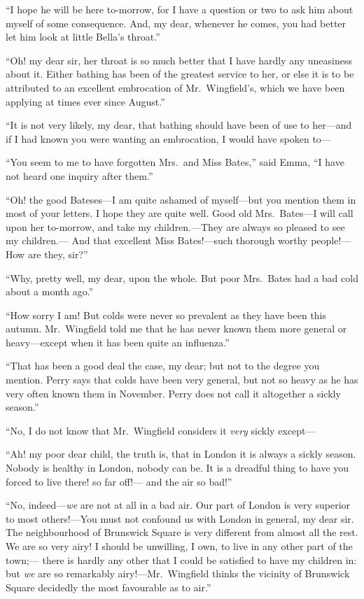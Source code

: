 ``I hope he will be here to-morrow, for I have a question or two to ask
him about myself of some consequence.  And, my dear, whenever he comes,
you had better let him look at little Bella's throat.''

``Oh! my dear sir, her throat is so much better that I have hardly
any uneasiness about it.  Either bathing has been of the greatest
service to her, or else it is to be attributed to an excellent
embrocation of Mr.\ Wingfield's, which we have been applying
at times ever since August.''

``It is not very likely, my dear, that bathing should have been
of use to her---and if I had known you were wanting an embrocation,
I would have spoken to---%

``You seem to me to have forgotten Mrs.\ and Miss Bates,'' said Emma,
``I have not heard one inquiry after them.''

``Oh! the good Bateses---I am quite ashamed of myself---but you
mention them in most of your letters.  I hope they are quite well.
Good old Mrs.\ Bates---I will call upon her to-morrow, and take
my children.---They are always so pleased to see my children.---%
And that excellent Miss Bates!---such thorough worthy people!---%
How are they, sir?''

``Why, pretty well, my dear, upon the whole.  But poor Mrs.\ Bates
had a bad cold about a month ago.''

``How sorry I am!  But colds were never so prevalent as they have been
this autumn.  Mr.\ Wingfield told me that he has never known them
more general or heavy---except when it has been quite an influenza.''

``That has been a good deal the case, my dear; but not to the degree
you mention.  Perry says that colds have been very general,
but not so heavy as he has very often known them in November.
Perry does not call it altogether a sickly season.''

``No, I do not know that Mr.\ Wingfield considers it \emph{very} sickly except---%

``Ah! my poor dear child, the truth is, that in London it is always
a sickly season.  Nobody is healthy in London, nobody can be.
It is a dreadful thing to have you forced to live there! so far off!---%
and the air so bad!''

``No, indeed---\emph{we} are not at all in a bad air.  Our part of London is
very superior to most others!---You must not confound us with London
in general, my dear sir.  The neighbourhood of Brunswick Square
is very different from almost all the rest.  We are so very airy!
I should be unwilling, I own, to live in any other part of the town;---%
there is hardly any other that I could be satisfied to have my
children in:  but \emph{we} are so remarkably airy!---Mr.\ Wingfield thinks
the vicinity of Brunswick Square decidedly the most favourable as
to air.''


